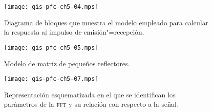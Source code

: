 \documentclass[a4paper,12pt]{article}
\begin{document}
\begin{figure}
	\begin{center}
		\texttt{[image: gis-pfc-ch5-04.mps]}
	\end{center}
	\caption[Modelo de emisión"=transmisión]{Diagrama de bloques que muestra el modelo empleado para calcular la respuesta al impulso de emisión"=recepción.}
	\label{fig:model}
\end{figure}

\begin{figure}
	\begin{center}
		\texttt{[image: gis-pfc-ch5-05.mps]}
	\end{center}
	\caption[Modelo de matriz de pequeños reflectores]{Modelo de matriz de pequeños reflectores.}
	\label{fig:matrix}
\end{figure}

\begin{figure}
	\begin{center}
		\texttt{[image: gis-pfc-ch5-07.mps]}
	\end{center}
	\caption[Parámetros del banco de filtros]{Representación esquematizada en el que se identifican los parámetros de la \textsc{fft} y su relación con respecto a la señal.}
	\label{fig:filter}
\end{figure}
% 
% 
\end{document}
